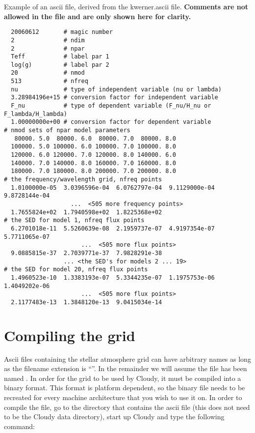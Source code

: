 \begin{table}
  \caption[Example of an ascii file, derived from the kwerner.ascii file.]
  {Example of an ascii file, derived from the kwerner.ascii file.
    {\bf Comments are not allowed in the file and are only shown here for clarity.}
    \label{def}}
  \small
\begin{verbatim}
  20060612       # magic number
  2              # ndim
  2              # npar
  Teff           # label par 1
  log(g)         # label par 2
  20             # nmod
  513            # nfreq
  nu             # type of independent variable (nu or lambda)
  3.28984196e+15 # conversion factor for independent variable
  F_nu           # type of dependent variable (F_nu/H_nu or F_lambda/H_lambda)
  1.00000000e+00 # conversion factor for dependent variable
# nmod sets of npar model parameters
   80000. 5.0  80000. 6.0  80000. 7.0  80000. 8.0
  100000. 5.0 100000. 6.0 100000. 7.0 100000. 8.0
  120000. 6.0 120000. 7.0 120000. 8.0 140000. 6.0
  140000. 7.0 140000. 8.0 160000. 7.0 160000. 8.0
  180000. 7.0 180000. 8.0 200000. 7.0 200000. 8.0
# the frequency/wavelength grid, nfreq points
  1.0100000e-05  3.0396596e-04  6.0762797e-04  9.1129000e-04  9.8728144e-04
                   ...  <505 more frequency points>
  1.7655824e+02  1.7940598e+02  1.8225368e+02
# the SED for model 1, nfreq flux points
  6.2701018e-11  5.5260639e-08  2.1959737e-07  4.9197354e-07  5.7711065e-07
                      ...  <505 more flux points>
  9.0885815e-37  2.7039771e-37  7.9828291e-38
                 ... <the SED's for models 2 ... 19>
# the SED for model 20, nfreq flux points
  1.4960523e-10  1.3383193e-07  5.3344235e-07  1.1975753e-06  1.4049202e-06
                      ...  <505 more flux points>
  2.1177483e-13  1.3848120e-13  9.0415034e-14
\end{verbatim}
\end{table}

\section{Compiling the grid}
\label{compiling}

Ascii files containing the stellar atmosphere grid can have arbitrary names as
long as the filename extension is ``''. In the remainder we
will assume the file has been named . In order for
the grid to be used by Cloudy, it must be compiled into a binary format. This
format is platform dependent, so the binary file needs to be recreated for
every machine architecture that you wish to use it on. In order to compile the
file, go to the directory that contains the ascii file (this does not need to
be the Cloudy data directory), start up Cloudy and type the following command:

